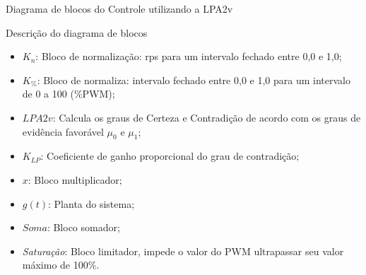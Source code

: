 \begin{frame}{Diagrama de blocos do Controle utilizando a LPA2v}
\begin{figure}[!h]
\label{fig:diagramaBlocosLPA2v}

\end{figure}


\end{frame}


\begin{frame}{Descrição do diagrama de blocos}


\begin{itemize}
  \item $K_n$: Bloco de normalização: rps para um intervalo fechado entre 0,0 e 1,0;

  \item $K_{\%}$: Bloco de normaliza: intervalo fechado entre 0,0 e 1,0 para um intervalo de 0 a 100 (\%PWM);

  \item $LPA2v$: Calcula os graus de Certeza e Contradição 
de acordo com os graus de evidência favorável $\mu _0$ e $\mu _1$;

  \item $K_{LP}$: Coeficiente de ganho proporcional do grau de contradição;

  \item $x$: Bloco multiplicador;

  \item $g(t)$: Planta do sistema;

  \item $Soma$: Bloco somador;

  \item \emph{Saturação}: Bloco limitador, impede o valor do PWM ultrapassar seu valor máximo de 100\%. 
\end{itemize}



\end{frame}



